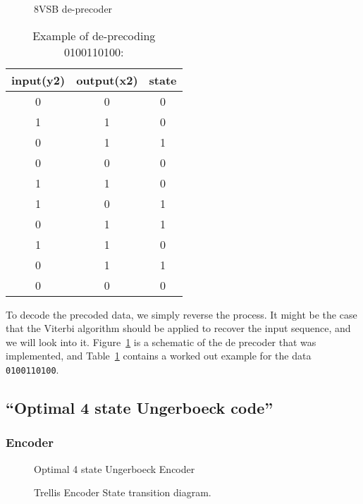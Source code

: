 \documentclass{article}
\begin{document}
\begin{figure}
\center
\epsfxsize=3.5in
\caption{8VSB de-precoder}
\label{fig:deprecoder}
\end{figure}

\begin{table}
\center
\begin{tabular}{c|c|c}
input(y2) & output(x2) & state  \\
\hline
0 & 0 & 0 \\
1 & 1 & 0 \\
0 & 1 & 1 \\
0 & 0 & 0 \\
1 & 1 & 0 \\
1 & 0 & 1 \\
0 & 1 & 1 \\
1 & 1 & 0 \\
0 & 1 & 1 \\
0 & 0 & 0 \\
\end{tabular}
\caption{Example of de-precoding 0100110100:}
\label{tbl:de_precoding_example}
\end{table}

To decode the precoded data, we simply reverse the process. It might be the case that 
the Viterbi algorithm should be applied to recover the input sequence, and we will
look into it. Figure~\ref{fig:deprecoder} is a schematic of the de precoder that was
implemented, and Table~\ref{tbl:de_precoding_example} contains a worked out example 
for the data \texttt{0100110100}.


\subsection{``Optimal 4 state Ungerboeck code''}

\subsubsection{Encoder}

\begin{figure}
\center
\epsfxsize=3.5in
\caption{Optimal 4 state Ungerboeck Encoder}
\label{fig:ungerboeck}
\end{figure}

\begin{figure}
\center
\epsfxsize=3.5in
\caption{Trellis Encoder State transition diagram.}
\label{fig:trellis-state-diagram}
\end{figure}
\end{document}

